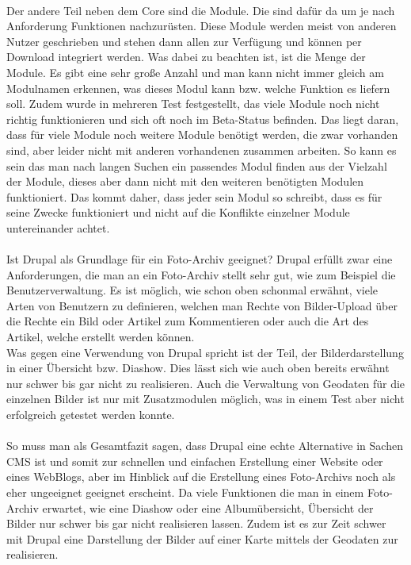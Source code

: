 \\
Der andere Teil neben dem Core sind die Module. Die sind dafür da um je nach Anforderung Funktionen nachzurüsten. Diese Module werden meist von anderen Nutzer geschrieben und stehen dann allen zur Verfügung und können per Download integriert werden.
Was dabei zu beachten ist, ist die Menge der Module. Es gibt eine sehr große Anzahl und man kann nicht immer gleich am Modulnamen erkennen, was dieses Modul kann bzw. welche Funktion es liefern soll. Zudem wurde in mehreren Test festgestellt, das viele Module noch nicht richtig funktionieren und sich oft noch im Beta-Status befinden. Das liegt daran, dass für viele Module noch weitere Module benötigt werden, die zwar vorhanden sind, aber leider nicht mit anderen vorhandenen zusammen arbeiten. So kann es sein das man nach langen Suchen ein passendes Modul finden aus der Vielzahl der Module, dieses aber dann nicht mit den weiteren benötigten Modulen funktioniert. Das kommt daher, dass jeder sein Modul so schreibt, dass es für seine Zwecke funktioniert und nicht auf die Konflikte einzelner Module untereinander achtet.\\
\\
Ist Drupal als Grundlage für ein Foto-Archiv geeignet?
Drupal erfüllt zwar eine Anforderungen, die man an ein Foto-Archiv stellt sehr gut, wie zum Beispiel die Benutzerverwaltung. Es ist möglich, wie schon oben schonmal erwähnt, viele Arten von Benutzern zu definieren, welchen man Rechte von Bilder-Upload über die Rechte ein Bild oder Artikel zum Kommentieren oder auch die Art des Artikel, welche erstellt werden können. \\
Was gegen eine Verwendung von Drupal spricht ist der Teil, der Bilderdarstellung in einer Übersicht bzw. Diashow. Dies lässt sich wie auch oben bereits erwähnt nur schwer bis gar nicht zu realisieren. Auch die Verwaltung von Geodaten für die einzelnen Bilder ist nur mit Zusatzmodulen möglich, was in einem Test aber nicht erfolgreich getestet werden konnte.\\
\\
So muss man als Gesamtfazit sagen, dass Drupal eine echte Alternative in Sachen CMS ist und somit zur schnellen und einfachen Erstellung einer Website oder eines WebBlogs, aber im Hinblick auf die Erstellung eines Foto-Archivs noch als eher ungeeignet geeignet erscheint. Da viele Funktionen die man in einem Foto-Archiv erwartet, wie eine Diashow oder eine Albumübersicht, Übersicht der Bilder nur schwer bis gar nicht realisieren lassen. Zudem ist es zur Zeit schwer mit Drupal eine Darstellung der Bilder auf einer Karte mittels der Geodaten zur realisieren.
